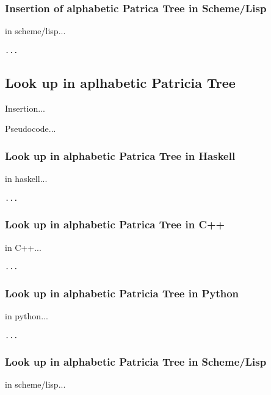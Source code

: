 \documentclass{article}
\begin{document}
\subsubsection*{Insertion of alphabetic Patrica Tree in Scheme/Lisp}
in scheme/lisp...

\lstset{language=lisp}
\begin{lstlisting}
...
\end{lstlisting}

\subsection{Look up in aplhabetic Patricia Tree}
Insertion...

Pseudocode...

\subsubsection*{Look up in alphabetic Patrica Tree in Haskell}
in haskell...

\lstset{language=Haskell}
\begin{lstlisting}
...
\end{lstlisting}

\subsubsection*{Look up in alphabetic Patrica Tree in C++}
in C++...

\lstset{language=C++}
\begin{lstlisting}
...
\end{lstlisting}


\subsubsection*{Look up in alphabetic Patricia Tree in Python}
in python...

\lstset{language=Python}
\begin{lstlisting}
...
\end{lstlisting}

\subsubsection*{Look up in alphabetic Patricia Tree in Scheme/Lisp}
in scheme/lisp...
\end{document}

